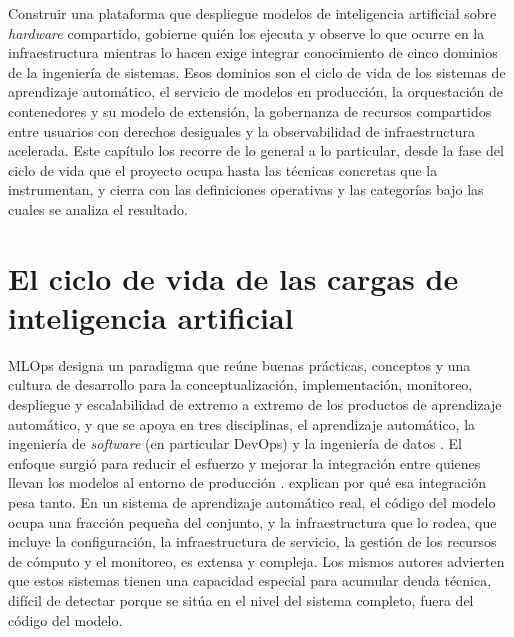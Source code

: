 Construir una plataforma que despliegue modelos de inteligencia artificial sobre \emph{hardware} compartido, gobierne quién los ejecuta y observe lo que ocurre en la infraestructura mientras lo hacen exige integrar conocimiento de cinco dominios de la ingeniería de sistemas. Esos dominios son el ciclo de vida de los sistemas de aprendizaje automático, el servicio de modelos en producción, la orquestación de contenedores y su modelo de extensión, la gobernanza de recursos compartidos entre usuarios con derechos desiguales y la observabilidad de infraestructura acelerada. Este capítulo los recorre de lo general a lo particular, desde la fase del ciclo de vida que el proyecto ocupa hasta las técnicas concretas que la instrumentan, y cierra con las definiciones operativas y las categorías bajo las cuales se analiza el resultado.

\section{El ciclo de vida de las cargas de inteligencia artificial}\label{sec:mlops-ciclo-vida}

MLOps designa un paradigma que reúne buenas prácticas, conceptos y una cultura de desarrollo para la conceptualización, implementación, monitoreo, despliegue y escalabilidad de extremo a extremo de los productos de aprendizaje automático, y que se apoya en tres disciplinas, el aprendizaje automático, la ingeniería de \emph{software} (en particular DevOps) y la ingeniería de datos \citep{kreuzberger-mlopsoverview-2023}. El enfoque surgió para reducir el esfuerzo y mejorar la integración entre quienes llevan los modelos al entorno de producción \citep{lima-mlopspractices-2022}. \citet{sculley-hiddentechnicaldebt-2015} explican por qué esa integración pesa tanto. En un sistema de aprendizaje automático real, el código del modelo ocupa una fracción pequeña del conjunto, y la infraestructura que lo rodea, que incluye la configuración, la infraestructura de servicio, la gestión de los recursos de cómputo y el monitoreo, es extensa y compleja. Los mismos autores advierten que estos sistemas tienen una capacidad especial para acumular deuda técnica, difícil de detectar porque se sitúa en el nivel del sistema completo, fuera del código del modelo.

